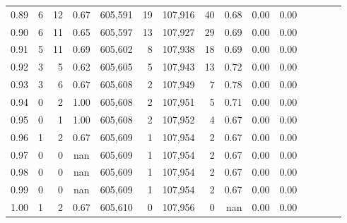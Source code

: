 \begin{tabular}{rrrcrrrrrrrrrrr}
0.89 &       6 &     12 &                                       0.67 &  605,591 &       19 &  107,916 &       40 &  0.68 &  0.00 &                         0.00 \\
0.90 &       6 &     11 &                                       0.65 &  605,597 &       13 &  107,927 &       29 &  0.69 &  0.00 &                         0.00 \\
0.91 &       5 &     11 &                                       0.69 &  605,602 &        8 &  107,938 &       18 &  0.69 &  0.00 &                         0.00 \\
0.92 &       3 &      5 &                                       0.62 &  605,605 &        5 &  107,943 &       13 &  0.72 &  0.00 &                         0.00 \\
0.93 &       3 &      6 &                                       0.67 &  605,608 &        2 &  107,949 &        7 &  0.78 &  0.00 &                         0.00 \\
0.94 &       0 &      2 &                                       1.00 &  605,608 &        2 &  107,951 &        5 &  0.71 &  0.00 &                         0.00 \\
0.95 &       0 &      1 &                                       1.00 &  605,608 &        2 &  107,952 &        4 &  0.67 &  0.00 &                         0.00 \\
0.96 &       1 &      2 &                                       0.67 &  605,609 &        1 &  107,954 &        2 &  0.67 &  0.00 &                         0.00 \\
0.97 &       0 &      0 &                                        nan &  605,609 &        1 &  107,954 &        2 &  0.67 &  0.00 &                         0.00 \\
0.98 &       0 &      0 &                                        nan &  605,609 &        1 &  107,954 &        2 &  0.67 &  0.00 &                         0.00 \\
0.99 &       0 &      0 &                                        nan &  605,609 &        1 &  107,954 &        2 &  0.67 &  0.00 &                         0.00 \\
1.00 &       1 &      2 &                                       0.67 &  605,610 &        0 &  107,956 &        0 &   nan &  0.00 &                         0.00 \\
\bottomrule
\end{tabular}
